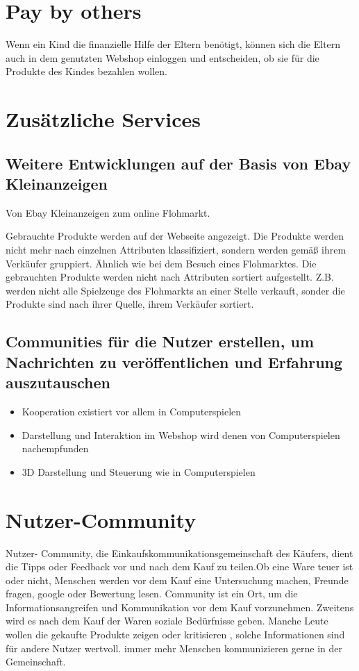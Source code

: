\section{Pay by others}

Wenn ein Kind die finanzielle Hilfe der Eltern benötigt, können sich die Eltern auch in dem genutzten Webshop einloggen und entscheiden, ob sie für die Produkte des Kindes bezahlen wollen.


\section{Zusätzliche Services}


\subsection{Weitere Entwicklungen auf der Basis von Ebay Kleinanzeigen}

Von Ebay Kleinanzeigen zum online Flohmarkt.

Gebrauchte Produkte werden auf der Webseite angezeigt. Die Produkte werden nicht mehr nach einzelnen Attributen klassifiziert, sondern werden gemäß ihrem Verkäufer gruppiert. Ähnlich wie bei dem Besuch eines Flohmarktes. Die gebrauchten Produkte werden nicht nach Attributen sortiert aufgestellt. Z.B. werden nicht alle Spielzeuge des Flohmarkts an einer Stelle verkauft, sonder die Produkte sind nach ihrer Quelle, ihrem Verkäufer sortiert.


\subsection{Communities  für die Nutzer erstellen, um Nachrichten zu veröffentlichen und Erfahrung auszutauschen}

\begin{itemize}
\item Kooperation existiert vor allem in Computerspielen
\item Darstellung und Interaktion im Webshop wird denen von Computerspielen nachempfunden
\item 3D Darstellung und Steuerung wie in Computerspielen
\end{itemize}


\section{Nutzer-Community}

Nutzer- Community,  die Einkaufskommunikationsgemeinschaft des Käufers, dient die Tipps oder Feedback vor und nach dem Kauf zu teilen.Ob eine Ware teuer ist oder nicht, Menschen werden vor dem Kauf eine Untersuchung machen, Freunde fragen, google oder  Bewertung lesen.  Community ist ein Ort, um die Informationsangreifen und Kommunikation vor dem Kauf vorzunehmen. Zweitens wird es nach dem Kauf der Waren soziale Bedürfnisse geben. Manche Leute wollen die gekaufte Produkte zeigen oder kritisieren , solche Informationen sind für andere Nutzer wertvoll.  immer mehr Menschen kommunizieren gerne in der Gemeinschaft.

